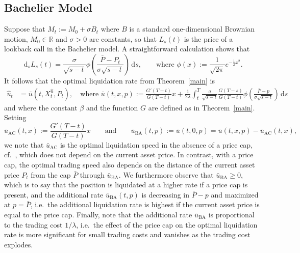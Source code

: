 \documentclass[11pt]{article}
\theoremstyle{definition}
\theoremstyle{remark}
\newcommand{\ts}{\textstyle}
\newcommand{\de}{\,\mathrm{d}}
\begin{document}
\subsection{Bachelier Model}
Suppose that $M_t:=M_0 + \sigma B_t$ where $B$ is a standard one-dimensional Brownian motion, $M_0\in\mathbb R$ and $ \sigma>0$ are constants, so that $L_s(t)$ is the price of a lookback call in the Bachelier model. A straightforward calculation shows that
\[
\de_s L_s(t) = \frac{\sigma}{\sqrt{s-t}}\phi\left(\frac{\bar{P}-P_t}{\sigma\sqrt{s-t}}\right)\de s,\qquad\text{where } \phi(x):=\frac{1}{\sqrt{2\pi}}e^{-\frac{1}{2}x^2}.
\]
It follows that the optimal liquidation rate from Theorem~\ref{main} is
\begin{align*}
\hat{u}_t & = \bar{u}(t,X^{\hat{u}}_t,P_t),\quad\text{where } \bar{u}(t,x,p) := \frac{G'(T-t)}{G(T-t)} x +\frac{1}{2\lambda} \int_t^T \frac{\sigma}{\sqrt{s-t}} \frac{G(T-s)}{G(T-t)} \phi\left(\frac{\bar{P}-p}{\sigma\sqrt{s-t}}\right) \de s
\end{align*}
and where the constant $\beta$ and the function $G$ are defined as in Theorem~\ref{main}. Setting
\[
 \bar{u}_{\mathrm{AC}}(t,x) := \frac{G'(T-t)}{G(T-t)} x\qquad\text{and}\qquad \bar{u}_{\mathrm{BA}}(t,p) := \bar{u}(t,0,p) = \bar{u}(t,x,p) -  \bar{u}_{\mathrm{AC}}(t,x),
\]
we note that $\bar{u}_{\mathrm{AC}}$ is the optimal liquidation speed in the absence of a price cap, cf.~\cite{almgren.chriss.01}, which does not depend on the current asset price. In contrast, with a price cap, the optimal trading speed also depends on the distance of the current asset price $P_t$ from the cap $\bar{P}$ through $\bar{u}_{\mathrm{BA}}$. We furthermore observe that $\bar{u}_{\mathrm{BA}}\ge 0$, which is to say that the position is liquidated at a higher rate if a price cap is present, and the additional rate $\bar{u}_{\mathrm{BA}}(t,p)$ is decreasing in $\bar P-p$ and maximized at $p = \bar P$, i.e.\ the additional liquidation rate is highest if the current asset price is equal to the price cap. Finally, note that the additional rate $\bar{u}_{\mathrm{BA}}$ is proportional to the trading cost $1/\lambda$, i.e.\ the effect of the price cap on the optimal liquidation rate is more significant for small trading costs and vanishes as the trading cost explodes.
\end{document}
